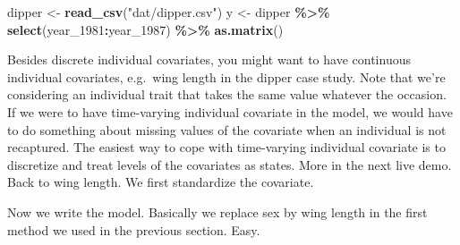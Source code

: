 \documentclass[
  12pt,
]{krantz}
\newenvironment{Shaded}{\begin{snugshade}}{\end{snugshade}}
\newcommand{\DocumentationTok}[1]{\textcolor[rgb]{0.56,0.35,0.01}{\textbf{\textit{#1}}}}
\newcommand{\FunctionTok}[1]{\textcolor[rgb]{0.13,0.29,0.53}{\textbf{#1}}}
\newcommand{\NormalTok}[1]{#1}
\newcommand{\OtherTok}[1]{\textcolor[rgb]{0.56,0.35,0.01}{#1}}
\newcommand{\SpecialCharTok}[1]{\textcolor[rgb]{0.81,0.36,0.00}{\textbf{#1}}}
\newcommand{\StringTok}[1]{\textcolor[rgb]{0.31,0.60,0.02}{#1}}
\begin{document}
\begin{Shaded}
\begin{Highlighting}[]
\NormalTok{dipper }\OtherTok{\textless{}{-}} \FunctionTok{read\_csv}\NormalTok{(}\StringTok{"dat/dipper.csv"}\NormalTok{)}
\NormalTok{y }\OtherTok{\textless{}{-}}\NormalTok{ dipper }\SpecialCharTok{\%\textgreater{}\%}
  \FunctionTok{select}\NormalTok{(year\_1981}\SpecialCharTok{:}\NormalTok{year\_1987) }\SpecialCharTok{\%\textgreater{}\%}
  \FunctionTok{as.matrix}\NormalTok{()}
\end{Highlighting}
\end{Shaded}

Besides discrete individual covariates, you might want to have continuous individual covariates, e.g.~wing length in the dipper case study. Note that we're considering an individual trait that takes the same value whatever the occasion. If we were to have time-varying individual covariate in the model, we would have to do something about missing values of the covariate when an individual is not recaptured. The easiest way to cope with time-varying individual covariate is to discretize and treat levels of the covariates as states. More in the next live demo. Back to wing length. We first standardize the covariate.

\begin{Shaded}
\end{Shaded}

Now we write the model. Basically we replace sex by wing length in the first method we used in the previous section. Easy.
\end{document}
